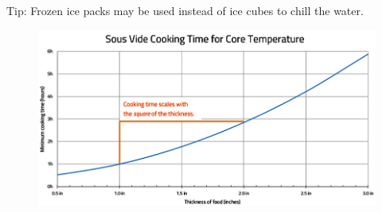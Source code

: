 \documentclass{article}
\numberwithin{figure}{section}
\numberwithin{equation}{section}
\begin{document}
Tip: Frozen ice packs may be used instead of ice cubes to chill the water. 


\begin{figure}[h]
\centering
\includegraphics[scale=.5]{sous_vide_plot.jpg}
\end{figure}
\end{document}
